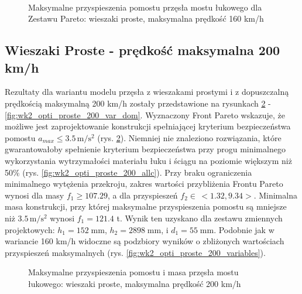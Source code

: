 \begin{figure}[hbt!]
	\centering
	\\
	\captionsetup{justification=centering}
	\caption{Maksymalne przyspieszenia pomostu przęsła mostu łukowego dla Zestawu Pareto: wieszaki proste, maksymalna prędkość 160 km/h}
	\label{fig:wk2_opti_proste_160_var_dom}
\end{figure}





\pagebreak[4]
\subsection{Wieszaki Proste - prędkość maksymalna 200 km/h}

Rezultaty dla wariantu modelu przęsła z wieszakami prostymi i z dopuszczalną prędkością maksymalną 200 km/h zostały przedstawione na rysunkach \ref{fig:wk2_opti_proste_200_all} - \ref{fig:wk2_opti_proste_200_var_dom}. Wyznaczony Front Pareto wskazuje, że możliwe jest zaprojektowanie konstrukcji spełniającej kryterium bezpieczeństwa pomostu $a_{max}\le 3.5\,\mathrm{m/s^2}$ (rys. \ref{fig:wk2_opti_proste_200_all}). Niemniej nie znaleziono rozwiązania, które gwarantowałoby spełnienie kryterium bezpieczeństwa przy progu minimalnego wykorzystania wytrzymałości materiału łuku i ściągu na poziomie większym niż 50\% (rys. \ref{fig:wk2_opti_proste_200_allc}). Przy braku ograniczenia minimalnego wytężenia przekroju, zakres wartości przybliżenia Frontu Pareto wynosi dla masy $f_1 \ge 107.29$, a dla przyspieszeń $f_2 \in\,<1.32,9.34>$. Minimalna masa konstrukcji, przy której maksymalne przyspieszenia pomostu są mniejsze niż $3.5\,\mathrm{m/s^2}$ wynosi $f_1 = 121.4$ t. Wynik ten uzyskano dla zestawu zmiennych projektowych: $h_1 = 152\;\mathrm{mm}$, $h_2 = 2898\;\mathrm{mm}$, i $d_1 = 55\;\mathrm{mm}$. Podobnie jak w wariancie 160 km/h widoczne są podzbiory wyników o zbliżonych wartościach przyspieszeń maksymalnych (rys. \ref{fig:wk2_opti_proste_200_variables}).

\begin{figure}[hbt!]
	\centering
	\captionsetup{justification=centering}
	\caption{Maksymalne przyspieszenia pomostu i masa przęsła mostu łukowego: wieszaki proste, maksymalna prędkość 200 km/h}
	\label{fig:wk2_opti_proste_200_all}
\end{figure}

